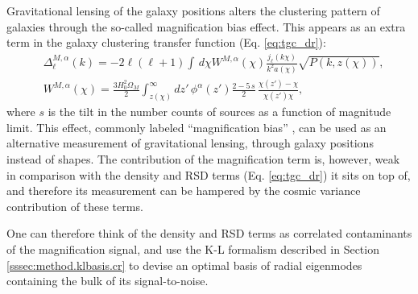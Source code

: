 \documentclass[twocolumn,amsfont,amssymb,amsmath, showpacs,balancelastpage, nofootinbib]{revtex4-1}
\begin{document}
%      
    Gravitational lensing of the galaxy positions alters the clustering pattern of galaxies through the so-called magnification bias effect. This appears as an extra term in the galaxy clustering transfer function (Eq. \ref{eq:tgc_dr}):
    \begin{align}\nonumber
      &\Delta^{M,\alpha}_\ell(k)=-2\ell(\ell+1)\int\,d\chi W^{M,\alpha}(\chi)\frac{j_\ell(k\chi)}{k^2a(\chi)}\sqrt{P(k,z(\chi))},\\
      &W^{M,\alpha}(\chi)=\frac{3H_0^2\Omega_M}{2}\int_{z(\chi)}^\infty dz'\,\phi^\alpha(z')\frac{2-5\,s}{2}\,\frac{\chi(z')-\chi}{\chi(z')\chi},
    \end{align}
    where $s$ is the tilt in the number counts of sources as a function of magnitude limit. This effect, commonly labeled ``magnification bias'' \cite{1967ApJ...147...61G,2000ApJ...537L..77M,2008PhRvD..77b3512L}, can be used as an alternative measurement of gravitational lensing, through galaxy positions instead of shapes. The contribution of the magnification term is, however, weak in comparison with the density and RSD terms (Eq. \ref{eq:tgc_dr}) it sits on top of, and therefore its measurement can be hampered by the cosmic variance contribution of these terms.
    
    One can therefore think of the density and RSD terms as correlated contaminants of the magnification signal, and use the K-L formalism described in Section \ref{sssec:method.klbasis.cr} to devise an optimal basis of radial eigenmodes containing the bulk of its signal-to-noise.
    
\end{document}
